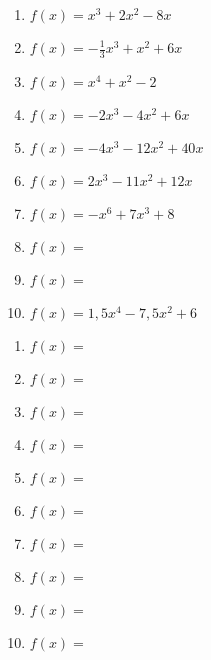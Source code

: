 \documentclass[a4paper,12pt, headsepline, ngerman]{scrartcl}
\theoremstyle{definition}
\begin{document}
\begin{minipage}{\textwidth}
	\begin{minipage}{.45\textwidth}
		\begin{Exercise}[title={\raggedright\normalfont Berechne jeweils die von der Funktion und der \(x\)-Achse eingeschlossene Fläche.}, label=flaecheRechnA1]
		\begin{enumerate}[label=\alph*)]
			\item \(f(x)=x^3+2x^2-8x\)
			\item \(f(x)=-\frac{1}{3}x^3+x^2+6x\)
			\item \(f(x)=x^4+x^2-2\)
			\item \(f(x)=-2x^3-4x^2+6x\)
			\item \(f(x)=-4x^3-12x^2+40x\)
			\item \(f(x)=2x^3-11x^2+12x\)
			\item \(f(x)=-x^6+7x^3+8\)
			\item \(f(x)=\)
			\item \(f(x)=\)
			\item \(f(x)=1,5x^4-7,5x^2+6\)
		\end{enumerate}
	\end{Exercise}
	\end{minipage}
	\begin{minipage}{.1\textwidth}
		\phantom{text}
	\end{minipage}
	\begin{minipage}{.45\textwidth}
		\begin{Exercise}[title={\raggedright\normalfont Berechne jeweils die von der Funktion und den Koordinatenachsen eingeschlossene Fläche.}, label=flaecheRechnA2]
		\begin{enumerate}[label=\alph*)]
			\item \(f(x)=\)
			\item \(f(x)=\)
			\item \(f(x)=\)
			\item \(f(x)=\)
			\item \(f(x)=\)
			\item \(f(x)=\)
			\item \(f(x)=\)
			\item \(f(x)=\)
			\item \(f(x)=\)
			\item \(f(x)=\)
		\end{enumerate}
	\end{Exercise}
	\end{minipage}
\end{minipage}
\end{document}
